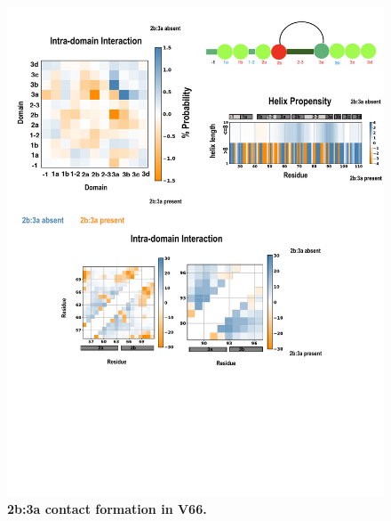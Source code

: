 \documentclass[journal=jacsat,manuscript=article]{achemso}
\begin{document}
\begin{figure}[!ht]
\includegraphics[scale=0.5,width=12cm,trim={0 0cm 0 0cm},clip]{../figures/coupling_2.pdf}
\caption{{\bf 2b:3a contact formation in V66.}
 }
\label{fig6}
\end{figure}
\end{document}

